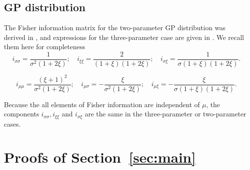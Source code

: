 \documentclass{article}
\newcommand{\1}{\mathds{1}}
\theoremstyle{definition}
\begin{document}
\subsection{GP distribution} \label{sec:fisher_gpd}
The Fisher information matrix for the two-parameter GP distribution was derived in \cite{smith1984threshold}, and expressions for the three-parameter case are given in \cite{taylor2019clustering}. We recall them here for completeness
\begin{equation*}
    i_{\sigma\sigma}=\frac{1}{\sigma^2(1+2\xi)}; \quad i_{\xi\xi}=\frac{2}{(1+\xi)(1+2\xi)}; \quad i_{\sigma\xi}=\frac{1}{\sigma(1+\xi)(1+2\xi)}.
\end{equation*}

\begin{equation*}
    i_{\mu\mu}=\frac{(\xi+1)^2}{\sigma^2(1+2\xi)}; \quad i_{\mu\sigma}=-\frac{\xi}{\sigma^2(1+2\xi)}; \quad i_{\mu\xi}=-\frac{\xi}{\sigma(1+\xi)(1+2\xi)}.
\end{equation*}

Because the all elements of Fisher information are independent of $\mu$, the components $i_{\sigma\sigma},i_{\xi\xi}$ and $i_{\sigma\xi}$ are the same in the three-parameter or two-parameter cases.

\section{Proofs of Section~\ref{sec:main}}\label{sec:appendix_proofs}
\end{document}
